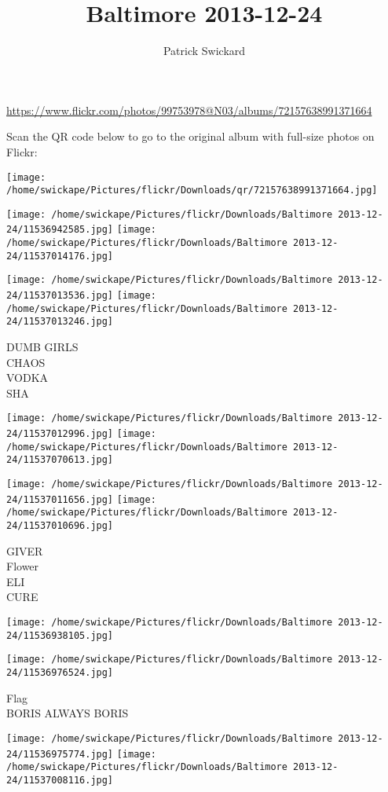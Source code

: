\documentclass[10pt,letterpaper]{article}
\title{Baltimore 2013-12-24}
\author{Patrick Swickard}
\date{}
\begin{document}
\maketitle

\url{https://www.flickr.com/photos/99753978@N03/albums/72157638991371664}

Scan the QR code below to go to the original album with full-size photos on Flickr:

\texttt{[image: /home/swickape/Pictures/flickr/Downloads/qr/72157638991371664.jpg]}
\pagebreak

\texttt{[image: /home/swickape/Pictures/flickr/Downloads/Baltimore 2013-12-24/11536942585.jpg]}
\texttt{[image: /home/swickape/Pictures/flickr/Downloads/Baltimore 2013-12-24/11537014176.jpg]}

\texttt{[image: /home/swickape/Pictures/flickr/Downloads/Baltimore 2013-12-24/11537013536.jpg]}
\texttt{[image: /home/swickape/Pictures/flickr/Downloads/Baltimore 2013-12-24/11537013246.jpg]}

DUMB GIRLS\\
CHAOS\\
VODKA\\
SHA
\pagebreak

\texttt{[image: /home/swickape/Pictures/flickr/Downloads/Baltimore 2013-12-24/11537012996.jpg]}
\texttt{[image: /home/swickape/Pictures/flickr/Downloads/Baltimore 2013-12-24/11537070613.jpg]}

\texttt{[image: /home/swickape/Pictures/flickr/Downloads/Baltimore 2013-12-24/11537011656.jpg]}
\texttt{[image: /home/swickape/Pictures/flickr/Downloads/Baltimore 2013-12-24/11537010696.jpg]}

GIVER\\
Flower\\
ELI\\
CURE
\pagebreak

\texttt{[image: /home/swickape/Pictures/flickr/Downloads/Baltimore 2013-12-24/11536938105.jpg]}

\vspace{0.25in}
\texttt{[image: /home/swickape/Pictures/flickr/Downloads/Baltimore 2013-12-24/11536976524.jpg]}

Flag\\
BORIS ALWAYS BORIS
\pagebreak

\texttt{[image: /home/swickape/Pictures/flickr/Downloads/Baltimore 2013-12-24/11536975774.jpg]}
\texttt{[image: /home/swickape/Pictures/flickr/Downloads/Baltimore 2013-12-24/11537008116.jpg]}
\end{document}
